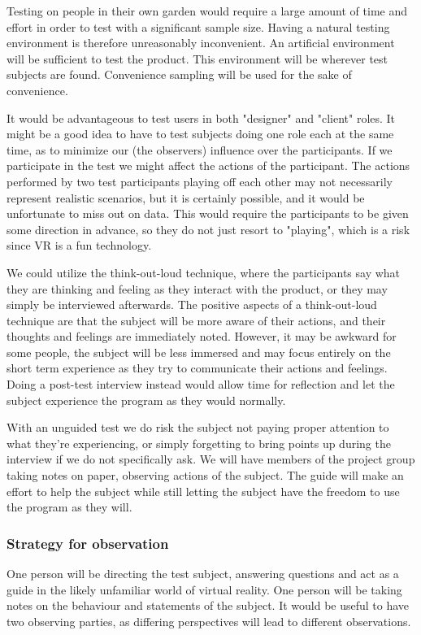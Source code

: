 Testing on people in their own garden would require a large amount of time and effort in order to test with a significant sample size. Having a natural testing environment is therefore unreasonably inconvenient. An artificial environment will be sufficient to test the product. This environment will be wherever test subjects are found. Convenience sampling will be used for the sake of convenience.

It would be advantageous to test users in both "designer" and "client" roles. It might be a good idea to have to test subjects doing one role each at the same time, as to minimize our (the observers) influence over the participants. If we participate in the test we might affect the actions of the participant. The actions performed by two test participants playing off each other may not necessarily represent realistic scenarios, but it is certainly possible, and it would be unfortunate to miss out on data. This would require the participants to be given some direction in advance, so they do not just resort to "playing", which is a risk since VR is a fun technology. 

We could utilize the think-out-loud technique, where the participants say what they are thinking and feeling as they interact with the product, or they may simply be interviewed afterwards.   
The positive aspects of a think-out-loud technique are that the subject will be more aware of their actions, and their thoughts and feelings are immediately noted. However, it may be awkward for some people, the subject will be less immersed and may focus entirely on the short term experience as they try to communicate their actions and feelings. Doing a post-test interview instead would allow time for reflection and let the subject experience the program as they would normally. 

With an unguided test we do risk the subject not paying proper attention to what they're experiencing, or simply forgetting to bring points up during the interview if we do not specifically ask. We will have members of the project group taking notes on paper, observing actions of the subject. The guide will make an effort to help the subject while still letting the subject have the freedom to use the program as they will.

\subsubsection{Strategy for observation}

One person will be directing the test subject, answering questions and act as a guide in the likely unfamiliar world of virtual reality. One person will be taking notes on the behaviour and statements of the subject. It would be useful to have two observing parties, as differing perspectives will lead to different observations. 

